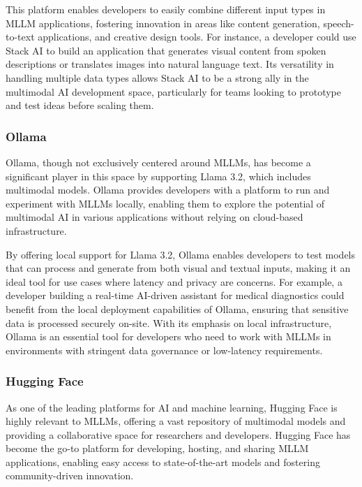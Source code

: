 This platform enables developers to easily combine different input types in MLLM applications, fostering innovation in areas like content generation, speech-to-text applications, and creative design tools. 
For instance, a developer could use Stack AI to build an application that generates visual content from spoken descriptions or translates images into natural language text. 
Its versatility in handling multiple data types allows Stack AI to be a strong ally in the multimodal AI development space, particularly for teams looking to prototype and test ideas before scaling them.

\subsubsection{Ollama}

Ollama, though not exclusively centered around MLLMs, has become a significant player in this space by supporting Llama 3.2, which includes multimodal models. 
Ollama provides developers with a platform to run and experiment with MLLMs locally, enabling them to explore the potential of multimodal AI in various applications without relying on cloud-based infrastructure.

By offering local support for Llama 3.2, Ollama enables developers to test models that can process and generate from both visual and textual inputs, making it an ideal tool for use cases where latency and privacy are concerns. 
For example, a developer building a real-time AI-driven assistant for medical diagnostics could benefit from the local deployment capabilities of Ollama, ensuring that sensitive data is processed securely on-site. 
With its emphasis on local infrastructure, Ollama is an essential tool for developers who need to work with MLLMs in environments with stringent data governance or low-latency requirements.

\subsubsection{Hugging Face}

As one of the leading platforms for AI and machine learning, Hugging Face is highly relevant to MLLMs, offering a vast repository of multimodal models and providing a collaborative space for researchers and developers. 
Hugging Face has become the go-to platform for developing, hosting, and sharing MLLM applications, enabling easy access to state-of-the-art models and fostering community-driven innovation.

